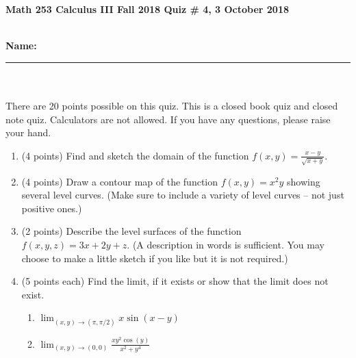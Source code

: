 \documentclass[11pt]{article}
\theoremstyle{remark}
\renewcommand{\d}{\displaystyle}
\begin{document}
{\bf Math 253 Calculus III Fall 2018 \hfill Quiz \# 4,  3 October 2018 }\\
\\
{\bf Name: \rule{3.5in}{1pt}}\\
\\
\noindent There are 20 points possible on this quiz. This is a closed
book quiz and closed note quiz. Calculators are not allowed. If you have any questions, please
raise your hand.

\begin{enumerate}
\item (4 points) Find and sketch the domain of the function $f(x,y)=\frac{x-y}{\sqrt{x+y}}.$
\vfill
\item (4 points) Draw a contour map of the function $f(x,y)=x^2y$ showing several level curves. (Make sure to include a variety of level curves -- not just positive ones.)
\vfill
\newpage
\item (2 points) Describe the level surfaces of the function $f(x,y,z)=3x+2y+z.$ (A description in words is sufficient. You may choose to make a little sketch if you like but it is not required.)
\vspace{1in}
\item (5 points each) Find the limit, if it exists or show that the limit does not exist.
	\begin{enumerate}
	\item $\d{\lim_{(x,y) \to (\pi, \pi/2)} x \sin(x-y)}$
	\vfill
	\item $\d{\lim_{(x,y) \to (0,0)}\frac{xy^2\cos(y)}{x^2+y^4}}$
	\vfill
	\end{enumerate}

\end{enumerate}
\end{document}
